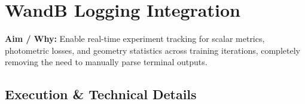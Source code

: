 \section[\textcolor{\statusSecTwo}{WandB Logging Integration}]{\textcolor{\statusSecTwo}{WandB Logging Integration}}

\begin{tcolorbox}[title={Status: [Completed]}, colframe=\statusSecTwo, colback=\statusSecTwo!5]
\textbf{Aim / Why:} Enable real-time experiment tracking for scalar metrics, photometric losses, and geometry statistics across training iterations, completely removing the need to manually parse terminal outputs.
\end{tcolorbox}

\subsection{Execution \& Technical Details}
